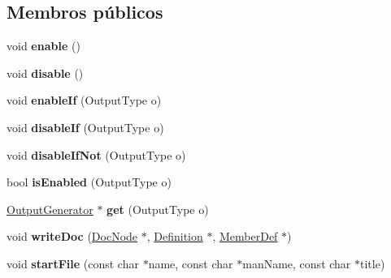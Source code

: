 \subsection*{Membros públicos}
\begin{DoxyCompactItemize}
\item 
\hypertarget{class_man_generator_a486f22824bd83c5308a0d70ffac6f758}{void {\bfseries enable} ()}\label{class_man_generator_a486f22824bd83c5308a0d70ffac6f758}

\item 
\hypertarget{class_man_generator_a8cfbbe53c1cf6e3054736daea3044c0f}{void {\bfseries disable} ()}\label{class_man_generator_a8cfbbe53c1cf6e3054736daea3044c0f}

\item 
\hypertarget{class_man_generator_a4cb683868aced938e5825344efcabbac}{void {\bfseries enable\-If} (Output\-Type o)}\label{class_man_generator_a4cb683868aced938e5825344efcabbac}

\item 
\hypertarget{class_man_generator_a7631c8cb9b2794dd29fbf9fc4f4e3fdc}{void {\bfseries disable\-If} (Output\-Type o)}\label{class_man_generator_a7631c8cb9b2794dd29fbf9fc4f4e3fdc}

\item 
\hypertarget{class_man_generator_a50896e6fa0a1ae81a11e07bc2d86bcbb}{void {\bfseries disable\-If\-Not} (Output\-Type o)}\label{class_man_generator_a50896e6fa0a1ae81a11e07bc2d86bcbb}

\item 
\hypertarget{class_man_generator_a79a2b8ce4bca9910d02b7a54ea547aba}{bool {\bfseries is\-Enabled} (Output\-Type o)}\label{class_man_generator_a79a2b8ce4bca9910d02b7a54ea547aba}

\item 
\hypertarget{class_man_generator_a256fd8270e935e213d393fb88d0f3737}{\hyperlink{class_output_generator}{Output\-Generator} $\ast$ {\bfseries get} (Output\-Type o)}\label{class_man_generator_a256fd8270e935e213d393fb88d0f3737}

\item 
\hypertarget{class_man_generator_a3cd433489757d690eee323e816d9c663}{void {\bfseries write\-Doc} (\hyperlink{class_doc_node}{Doc\-Node} $\ast$, \hyperlink{class_definition}{Definition} $\ast$, \hyperlink{class_member_def}{Member\-Def} $\ast$)}\label{class_man_generator_a3cd433489757d690eee323e816d9c663}

\item 
\hypertarget{class_man_generator_a642331f37add1aa818a86124a5fe4723}{void {\bfseries start\-File} (const char $\ast$name, const char $\ast$man\-Name, const char $\ast$title)}\label{class_man_generator_a642331f37add1aa818a86124a5fe4723}


\end{DoxyCompactItemize}
